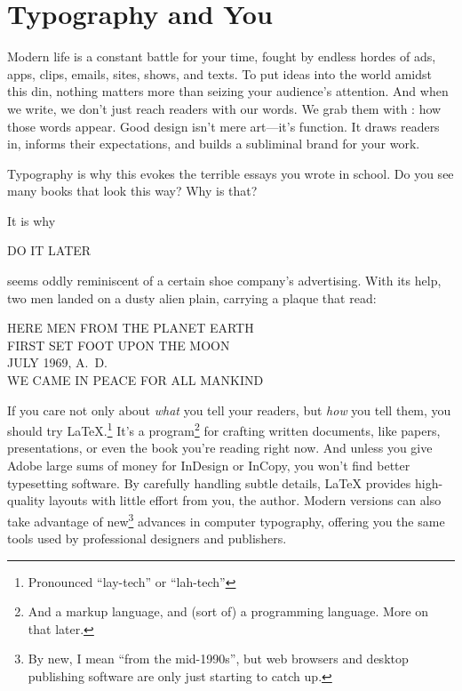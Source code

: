 \chapter{Typography and You}
\label{typography}

Modern life is a constant battle for your time,
fought by endless hordes of ads, apps, clips, emails, sites, shows, and texts.
To put ideas into the world amidst this din,
nothing matters more than seizing
your audience's attention.
And when we write, we don't just reach readers with our words.
We grab them with : how those words appear.
Good design isn't mere art---it's function.
It draws readers in,
informs their expectations, and builds a subliminal brand for your
work.\punckern{}
\begin{leftfigure}
\fontsize{12pt}{24pt}\selectfont\raggedright
Typography is why this evokes the terrible essays
you wrote in school.
Do you see many books that look this way?
Why is that?
\end{leftfigure}
\medskip

\noindent It is why
\begin{leftfigure}
\Large DO IT LATER
\end{leftfigure}
seems oddly reminiscent of a certain shoe company's advertising.
With its help,\punckern{}
two men landed on a dusty alien plain, carrying a plaque that read:
\begin{center}
HERE MEN FROM THE PLANET EARTH \\
FIRST SET FOOT UPON THE MOON \\
JULY 1969, A.~D. \\
WE CAME IN PEACE FOR ALL MANKIND
\end{center}

If you care not only about \emph{what} you tell your readers, but \emph{how}
you tell them, you should try \LaTeX.\punckern\footnote{Pronounced ``lay-tech''
or ``lah-tech''}
It's a program\footnote{And a markup language,
and (sort of) a programming language.
More on that later.}
for crafting written documents, like papers, presentations,
or even the book you're reading right now.
And unless you give Adobe large sums
of money for InDesign or InCopy,
you won't find better typesetting software.
By carefully handling subtle details,
\LaTeX{} provides high-quality layouts
with little effort from you, the author.
Modern versions can also take advantage of new\footnote{By new,
I mean ``from the mid-1990s''\quotekern, but web browsers and desktop publishing
software are only just starting to catch up.} advances in computer typography,
offering you the same tools used by professional designers and publishers.

